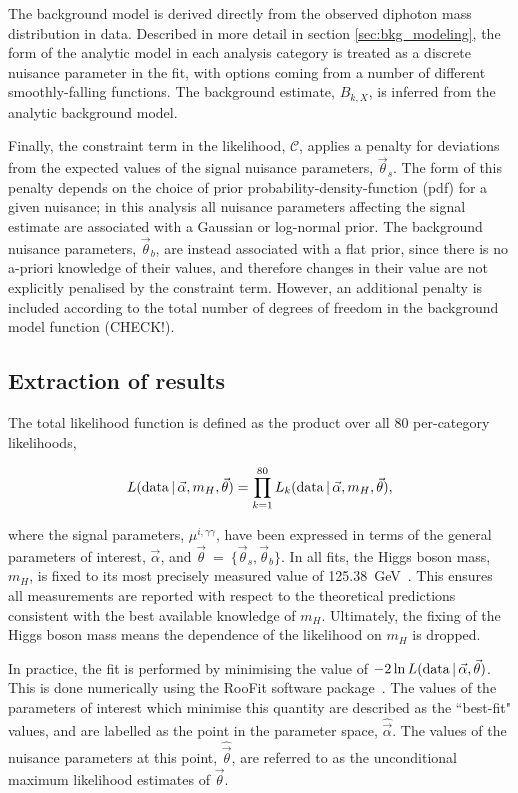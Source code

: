 The background model is derived directly from the observed diphoton mass distribution in data. Described in more detail in section \ref{sec:bkg_modeling}, the form of the analytic model in each analysis category is treated as a discrete nuisance parameter in the fit, with options coming from a number of different smoothly-falling functions. The background estimate, $B_{k,X}$, is inferred from the analytic background model.

Finally, the constraint term in the likelihood, $\mathcal{C}$, applies a penalty for deviations from the expected values of the signal nuisance parameters, $\vec{\theta}_s$. The form of this penalty depends on the choice of prior probability-density-function (pdf) for a given nuisance; in this analysis all nuisance parameters affecting the signal estimate are associated with a Gaussian or log-normal prior. The background nuisance parameters, $\vec{\theta}_b$, are instead associated with a flat prior, since there is no a-priori knowledge of their values, and therefore changes in their value are not explicitly penalised by the constraint term. However, an additional penalty is included according to the total number of degrees of freedom in the background model function (CHECK!). 

\subsection{Extraction of results}
The total likelihood function is defined as the product over all 80 per-category likelihoods,

\begin{equation}
    L({\rm{data}}\,|\,\vec{\alpha},m_H,\vec{\theta}) = \prod_{k=1}^{80}  L_k({\rm{data}}\,|\,\vec{\alpha},m_H,\vec{\theta}),
\end{equation}

\noindent
where the signal parameters, $\mu^{i,\gamma\gamma}$, have been expressed in terms of the general parameters of interest, $\vec{\alpha}$, and $\vec{\theta}$~=~$\{\vec{\theta}_s,\vec{\theta}_b\}$. In all fits, the Higgs boson mass, $m_H$, is fixed to its most precisely measured value of 125.38~GeV~\cite{Sirunyan:2020xwk}. This ensures all measurements are reported with respect to the theoretical predictions consistent with the best available knowledge of $m_H$. Ultimately, the fixing of the Higgs boson mass means the dependence of the likelihood on $m_H$ is dropped.

In practice, the fit is performed by minimising the value of $-2 \ln L({\rm{data}}\,|\,\vec{\alpha},\vec{\theta})$. This is done numerically using the RooFit software package~\cite{Verkerke:2003ir}. The values of the parameters of interest which minimise this quantity are described as the ``best-fit" values, and are labelled as the point in the parameter space, $\hat{\vec{\alpha}}$. The values of the nuisance parameters at this point, $\hat{\vec{\theta}}$, are referred to as the unconditional maximum likelihood estimates of $\vec{\theta}$. 

